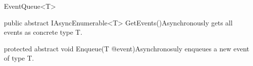 \begin{absclass}{EventQueue<T>}



    \begin{methods}
        \begin{method}{public abstract IAsyncEnumerable<T> GetEvents()}{Asynchronously gets all events as concrete type T.}
        \end{method}
        \begin{method}{protected abstract void Enqueue(T @event)}{Asynchronosuly enqueues a new event of type T.}
            \begin{parameters}
            \end{parameters}
        \end{method}
    \end{methods}
\end{absclass}